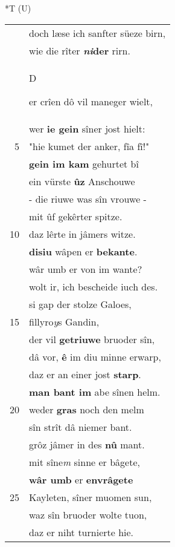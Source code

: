 \documentclass[8pt,a4paper,notitlepage]{article}
\begin{document}
\begin{table}[ht]
\begin{minipage}[t]{0.5\linewidth}
\end{minipage}
\hspace{0.5cm}
\begin{minipage}[t]{0.5\linewidth}
\small
\begin{center}*T (U)
\end{center}
\begin{tabular}{rl}
 & doch læse ich sanfter süeze birn,\\ 
 & wie die rîter \textbf{\textit{ni}der} rirn.\\ 
 & \begin{large}D\end{large}er crîen dô vil maneger wielt,\\ 
 & wer \textbf{ie gein} sîner jost hielt:\\ 
5 & "hie kumet der anker, fîa fî!"\\ 
 & \textbf{gein im kam} gehurtet bî\\ 
 & ein vürste \textbf{ûz} Anschouwe\\ 
 & - die riuwe was sîn vrouwe -\\ 
 & mit ûf gekêrter spitze.\\ 
10 & daz lêrte in jâmers witze.\\ 
 & \textbf{disiu} wâpen er \textbf{bekante}.\\ 
 & wâr umb er von im wante?\\ 
 & wolt ir, ich bescheide iuch des.\\ 
 & si gap der stolze Galoes,\\ 
15 & fillyro\textit{y}s Gandin,\\ 
 & der vil \textbf{getriuwe} bruoder sîn,\\ 
 & dâ vor, \textbf{ê} im diu minne erwarp,\\ 
 & daz er an einer jost \textbf{starp}.\\ 
 & \textbf{man bant im} abe sînen helm.\\ 
20 & weder \textbf{gras} noch den melm\\ 
 & sîn strît dâ niemer bant.\\ 
 & grôz jâmer in des \textbf{nû} mant.\\ 
 & mit sîne\textit{m} sinne er bâgete,\\ 
 & \textbf{wâr umb} er \textbf{en}\textbf{vrâgete}\\ 
25 & Kayleten, sîner muomen sun,\\ 
 & waz sîn bruoder wolte tuon,\\ 
 & daz er niht turnierte hie.\\ 

\end{tabular}
\end{minipage}
\end{table}
\end{document}
